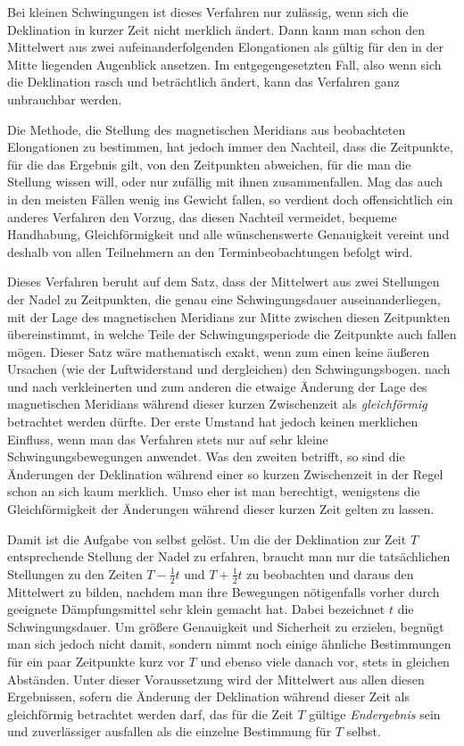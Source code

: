 Bei kleinen Schwingungen ist dieses Verfahren nur zulässig, wenn sich die Deklination in kurzer Zeit nicht merklich ändert. Dann kann man schon den Mittelwert aus zwei aufeinanderfolgenden Elongationen als gültig für den in der Mitte liegenden Augenblick ansetzen. Im entgegengesetzten Fall, also wenn sich die Deklination rasch und beträchtlich ändert, kann das Verfahren ganz unbrauchbar werden.

Die Methode, die Stellung des magnetischen Meridians aus beobachteten Elongationen zu bestimmen, hat jedoch immer den Nachteil, dass die Zeitpunkte, für die das Ergebnis gilt, von den Zeitpunkten abweichen, für die man die Stellung wissen will, oder nur zufällig mit ihnen zusammenfallen. Mag das auch in den meisten Fällen wenig ins Gewicht fallen, so verdient doch offensichtlich ein anderes Verfahren den Vorzug, das diesen Nachteil vermeidet, bequeme Handhabung, Gleichförmigkeit und alle wünschenswerte Genauigkeit vereint und deshalb von allen Teilnehmern an den Terminbeobachtungen befolgt wird.

Dieses Verfahren beruht auf dem Satz, dass der Mittelwert aus zwei Stellungen der Nadel zu Zeitpunkten, die genau eine Schwingungsdauer auseinanderliegen, mit der Lage des magnetischen Meridians zur Mitte zwischen diesen Zeitpunkten übereinstimmt, in welche Teile der Schwingungsperiode die Zeitpunkte auch fallen mögen. Dieser Satz wäre mathematisch exakt, wenn zum einen keine äußeren Ursachen (wie der Luftwiderstand und dergleichen) den Schwingungsbogen. nach und nach verkleinerten und zum anderen die etwaige Änderung der Lage des magnetischen Meridians während dieser kurzen Zwischenzeit als \textit{gleichförmig} betrachtet werden dürfte. Der erste Umstand hat jedoch keinen merklichen Einfluss, wenn man das Verfahren stets nur auf sehr kleine Schwingungsbewegungen anwendet. Was den zweiten betrifft, so sind die Änderungen der Deklination während einer so kurzen Zwischenzeit in der Regel schon an sich kaum merklich. Umso eher ist man berechtigt, wenigstens die Gleichförmigkeit der Änderungen während dieser kurzen Zeit gelten zu lassen.

Damit ist die Aufgabe von selbst gelöst. Um die der Deklination zur Zeit $T$ entsprechende Stellung der Nadel zu erfahren, braucht man nur die tatsächlichen Stellungen zu den Zeiten $T-\tfrac12t$ und $T+\tfrac12t$ zu beobachten und daraus den Mittelwert zu bilden, nachdem man ihre Bewegungen nötigenfalls vorher durch geeignete Dämpfungsmittel sehr klein gemacht hat. Dabei bezeichnet $t$ die Schwingungsdauer. Um größere Genauigkeit und Sicherheit zu erzielen, begnügt man sich jedoch nicht damit, sondern nimmt noch einige ähnliche Bestimmungen für ein paar Zeitpunkte kurz vor $T$ und ebenso viele danach vor, stets in gleichen Abständen. Unter dieser Voraussetzung wird der Mittelwert aus allen diesen Ergebnissen, sofern die Änderung der Deklination während dieser Zeit als gleichförmig betrachtet werden darf, das für die Zeit $T$ gültige \textit{Endergebnis} sein und zuverlässiger ausfallen als die einzelne Bestimmung für $T$ selbst.

